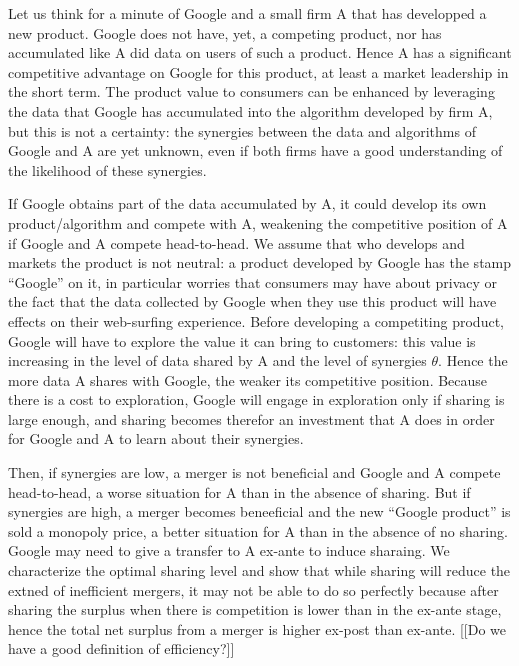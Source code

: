 \documentclass[a4paper,leqno]{article}%
\renewcommand{\t}{\theta}
\renewcommand{\t}{\theta}
\begin{document}
Let us think for a minute of Google and a small firm A that has developped a new product. Google does not have, yet, a competing product, nor has accumulated like A did data on users of such a product. Hence A has a significant competitive advantage on Google for this product, at least a market leadership in the short term. The product value to consumers can be enhanced by leveraging the data that Google has accumulated into the algorithm developed by firm A, but this is not a certainty: the synergies between the data and algorithms of Google and A are yet unknown, even if both firms have a good understanding of the likelihood of these synergies. 

If Google obtains part of the data accumulated by A, it could develop its own product/algorithm and compete with A, weakening the competitive position of A if Google and A compete head-to-head. We assume that who develops and markets the product is not neutral: a product developed by Google has the stamp ``Google'' on it, in particular worries that consumers may have about privacy or the fact that the data collected by Google when they use this product will have effects on their web-surfing experience. Before developing a competiting product, Google will have to explore the value it can bring to customers: this value is increasing in the level of data shared by A and the level of synergies $\t$. Hence the more data A shares with Google, the weaker its competitive position. Because there is a cost to exploration, Google will engage in exploration only if sharing is large enough, and sharing becomes therefor an investment that A does in order for Google and A to learn about their synergies.

Then, if synergies are low, a merger is not beneficial and Google and A compete head-to-head, a worse situation for A than in the absence of sharing. But if synergies are high, a merger becomes beneeficial and the new ``Google product'' is sold a monopoly price, a better situation for A than in the absence of no sharing. Google may need to give a transfer to A ex-ante to induce sharaing. We characterize the optimal sharing level and show that while sharing will reduce the extned of inefficient mergers, it may not be able to do so perfectly because after sharing the surplus when there is competition is lower than in the ex-ante stage, hence the total net surplus from a merger is higher ex-post than ex-ante. [[Do we have a good definition of efficiency?]]
\end{document}
